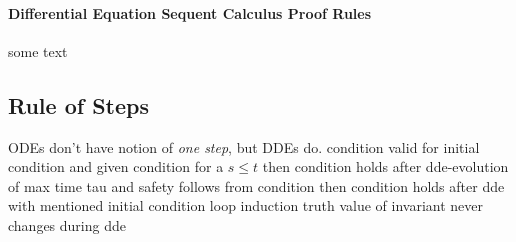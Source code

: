 \documentclass[10pt]{report}
\begin{document}
        \begin{calculus}
        \end{calculus}

    \paragraph{Differential Equation Sequent Calculus Proof Rules}
        \label{sec:ode-rules}

        some text

        \begin{calculus}
        \end{calculus}

    \subsection{Rule of Steps}
        \label{sec:rule-of-steps}
        ODEs don't have notion of \emph{one step}, but DDEs do.
        condition valid for initial condition and given condition for a $s\leq t$ then condition holds after dde-evolution of max time tau and safety follows from condition then condition holds after dde with mentioned initial condition
        loop induction
        truth value of invariant never changes during dde
\end{document}
